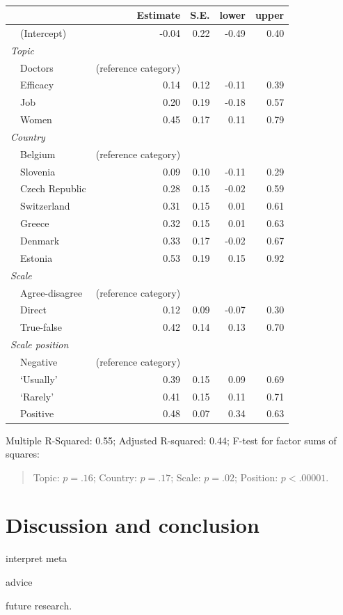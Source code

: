 \documentclass[a4paper,12pt]{article}
\begin{document}
\begin{table}\centering\caption{\label{tab:meta}}
\begin{minipage}[ht]{.73\textwidth}
\begin{tabular}{llrrrr}
\hline
 &  & Estimate & S.E. & lower & upper\\
 \hline
 & (Intercept) & -0.04 & 0.22 & -0.49 & 0.40\\
\multicolumn{2}{l}{\textit{Topic}}&  &  &  & \\
 & Doctors & (reference category) &  &  & \\
 & Efficacy & 0.14 & 0.12 & -0.11 & 0.39\\
 & Job & 0.20 & 0.19 & -0.18 & 0.57\\
 & Women & 0.45 & 0.17 & 0.11 & 0.79\\
\multicolumn{2}{l}{\textit{Country  } }&  &  &  & \\
 & Belgium & (reference category) &  &  & \\
 & Slovenia & 0.09 & 0.10 & -0.11 & 0.29\\
 & Czech Republic & 0.28 & 0.15 & -0.02 & 0.59\\
 & Switzerland & 0.31 & 0.15 & 0.01 & 0.61\\
 & Greece & 0.32 & 0.15 & 0.01 & 0.63\\
 & Denmark & 0.33 & 0.17 & -0.02 & 0.67\\
 & Estonia & 0.53 & 0.19 & 0.15 & 0.92\\
\multicolumn{2}{l}{\textit{Scale   }}&  &  &  & \\
 & Agree-disagree & (reference category) &  &  & \\
 & Direct & 0.12 & 0.09 & -0.07 & 0.30\\
 & True-false & 0.42 & 0.14 & 0.13 & 0.70\\
\multicolumn{2}{l}{\textit{Scale position}   }&  &  &  & \\
 & Negative & (reference category) &  &  & \\
 & `Usually' & 0.39 & 0.15 & 0.09 & 0.69\\
 & `Rarely' & 0.41 & 0.15 & 0.11 & 0.71\\
 & Positive & 0.48 & 0.07 & 0.34 & 0.63\\
\hline
\end{tabular}

Multiple R-Squared: 0.55; Adjusted R-squared: 0.44; F-test for factor sums of squares: 
\begin{quote}Topic: $p=.16$; Country: $p=.17$; Scale: $p=.02$; Position: $p<.00001$.\end{quote}
\end{minipage}
\end{table}


\section{Discussion and conclusion}

interpret meta

advice

future research.

\newpage

\end{document}
